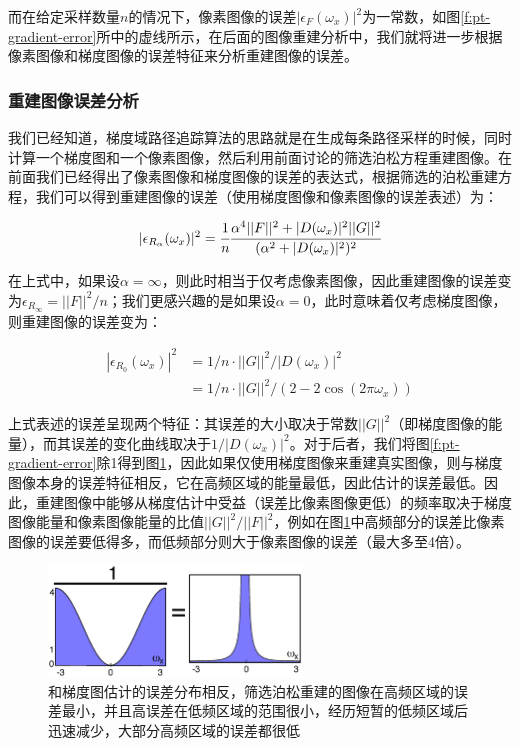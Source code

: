 而在给定采样数量$n$的情况下，像素图像的误差$|\epsilon_F(\omega_x)|^2$为一常数，如图\ref{f:pt-gradient-error}所中的虚线所示，在后面的图像重建分析中，我们就将进一步根据像素图像和梯度图像的误差特征来分析重建图像的误差。






\subsubsection{重建图像误差分析}
我们已经知道，梯度域路径追踪算法的思路就是在生成每条路径采样的时候，同时计算一个梯度图和一个像素图像，然后利用前面讨论的筛选泊松方程重建图像。在前面我们已经得出了像素图像和梯度图像的误差的表达式，根据筛选的泊松重建方程，我们可以得到重建图像的误差（使用梯度图像和像素图像的误差表述）为：

\begin{equation}
	|\epsilon_{R_{\alpha}}(\omega_x)|^2= \cfrac{1}{n} \cfrac{\alpha^4||F||^2 +|D(\omega_x)|^2||G||^2}{(\alpha^2 + |D(\omega_x)|^2 )^2}
\end{equation}

在上式中，如果设$\alpha=\infty$，则此时相当于仅考虑像素图像，因此重建图像的误差变为$\epsilon_{R_\infty}=||F||^2/n$；我们更感兴趣的是如果设$\alpha=0$，此时意味着仅考虑梯度图像，则重建图像的误差变为：

\begin{equation}
\begin{aligned}
	|\epsilon_{R_0}(\omega_x)|^2 &=1/n\cdot||G||^2/|D(\omega_x)|^2\\
	&=1/n\cdot||G||^2/(2-2\cos(2\pi\omega_x) )
\end{aligned}
\end{equation}

上式表述的误差呈现两个特征：其误差的大小取决于常数$||G||^2$（即梯度图像的能量），而其误差的变化曲线取决于$1/|D(\omega_x)|^2$。对于后者，我们将图\ref{f:pt-gradient-error}除1得到图\ref{f:pt-reconstruction-error}，因此如果仅使用梯度图像来重建真实图像，则与梯度图像本身的误差特征相反，它在高频区域的能量最低，因此估计的误差最低。因此，重建图像中能够从梯度估计中受益（误差比像素图像更低）的频率取决于梯度图像能量和像素图像能量的比值$||G||^2/||F||^2$，例如在图\ref{f:pt-reconstruction-error}中高频部分的误差比像素图像的误差要低得多，而低频部分则大于像素图像的误差（最大多至4倍）。

\begin{figure}
	\sidecaption
	\includegraphics[width=0.6\textwidth]{figures/pt/reconstruction-error}
	\caption{和梯度图估计的误差分布相反，筛选泊松重建的图像在高频区域的误差最小，并且高误差在低频区域的范围很小，经历短暂的低频区域后迅速减少，大部分高频区域的误差都很低}
	\label{f:pt-reconstruction-error}
\end{figure}

